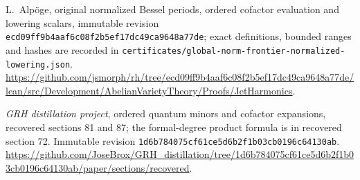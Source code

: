 L.~Alp\"oge, original normalized Bessel periods, ordered cofactor
evaluation and lowering scalars, immutable revision
\texttt{ecd09ff9b4aaf6c08f2b5ef17dc49ca9648a77de}; exact definitions,
bounded ranges and hashes are recorded in
\texttt{certificates/global-norm-frontier-normalized-lowering.json}.
\url{https://github.com/jsmorph/rh/tree/ecd09ff9b4aaf6c08f2b5ef17dc49ca9648a77de/lean/src/Development/AbelianVarietyTheory/Proofs/JetHarmonics}.

\emph{GRH distillation project}, ordered quantum minors and cofactor
expansions, recovered sections 81 and 87; the formal-degree product
formula is in recovered section 72.  Immutable revision
\texttt{1d6b784075cf61ce5d6b2f1b03cb0196c64130ab}.
\url{https://github.com/JoseBrox/GRH_distillation/tree/1d6b784075cf61ce5d6b2f1b03cb0196c64130ab/paper/sections/recovered}.
